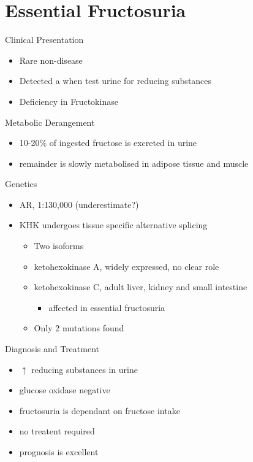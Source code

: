 \documentclass[presentation, smaller]{beamer}
\begin{document}
\section{Essential Fructosuria}
\label{sec:orgb7bde87}
\begin{frame}[label={sec:org0d80129}]{Clinical Presentation}
\begin{itemize}
\item Rare non-disease
\item Detected a when test urine for reducing substances
\item Deficiency in Fructokinase
\end{itemize}
\end{frame}
\begin{frame}[label={sec:org5244a60}]{Metabolic Derangement}
\begin{itemize}
\item 10-20\% of ingested fructose is excreted in urine
\item remainder is slowly metabolised in adipose tissue and muscle
\end{itemize}
\end{frame}
\begin{frame}[label={sec:orgc3774ac}]{Genetics}
\begin{itemize}
\item AR, 1:130,000 (underestimate?)
\item KHK undergoes tissue specific alternative splicing
\begin{itemize}
\item Two isoforms
\item ketohexokinase A, widely expressed, no clear role
\item ketohexokinase C, adult liver, kidney and small intestine
\begin{itemize}
\item affected in essential fructosuria
\end{itemize}
\item Only 2 mutations found
\end{itemize}
\end{itemize}
\end{frame}
\begin{frame}[label={sec:orgc7fa4e6}]{Diagnosis and Treatment}
\begin{itemize}
\item \(\uparrow\) reducing substances in urine
\item glucose oxidase negative
\item fructosuria is dependant on fructose intake
\item no treatent required
\item prognosis is excellent
\end{itemize}
\end{frame}
\end{document}
